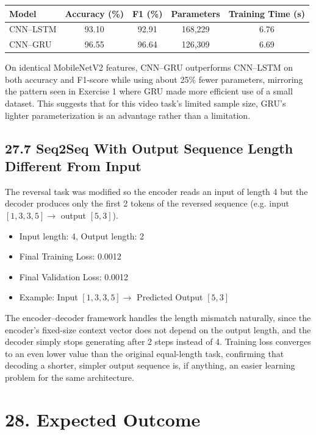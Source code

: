 \documentclass[10pt]{article}
\begin{document}
\begin{center}
\begin{tabular}{|l|c|c|c|c|}
\hline
Model & Accuracy (\%) & F1 (\%) & Parameters & Training Time (s)\\
\hline
CNN--LSTM & 93.10 & 92.91 & 168{,}229 & 6.76\\
CNN--GRU & 96.55 & 96.64 & 126{,}309 & 6.69\\
\hline
\end{tabular}
\end{center}

On identical MobileNetV2 features, CNN--GRU outperforms CNN--LSTM on both accuracy and F1-score while using about 25\% fewer parameters, mirroring the pattern seen in Exercise 1 where GRU made more efficient use of a small dataset. This suggests that for this video task's limited sample size, GRU's lighter parameterization is an advantage rather than a limitation.

\subsection*{27.7 Seq2Seq With Output Sequence Length Different From Input}

The reversal task was modified so the encoder reads an input of length 4 but the decoder produces only the first 2 tokens of the reversed sequence (e.g. input $[1,3,3,5] \to$ output $[5,3]$).

\begin{itemize}
\item Input length: 4, Output length: 2
\item Final Training Loss: 0.0012
\item Final Validation Loss: 0.0012
\item Example: Input $[1, 3, 3, 5] \to$ Predicted Output $[5, 3]$
\end{itemize}

The encoder--decoder framework handles the length mismatch naturally, since the encoder's fixed-size context vector does not depend on the output length, and the decoder simply stops generating after 2 steps instead of 4. Training loss converges to an even lower value than the original equal-length task, confirming that decoding a shorter, simpler output sequence is, if anything, an easier learning problem for the same architecture.

\section*{28. Expected Outcome}
\end{document}
